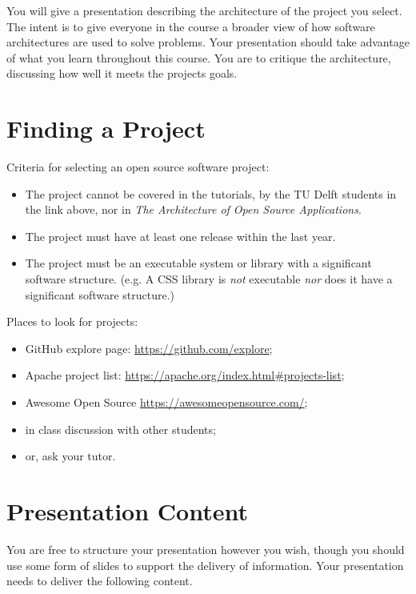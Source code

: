 \documentclass{csse4400}
\begin{document}
You will give a presentation describing the architecture of the project you select.
The intent is to give everyone in the course a broader view of how software architectures are used to solve problems.
Your presentation should take advantage of what you learn throughout this course.
You are to critique the architecture, discussing how well it meets the projects goals.


\section{Finding a Project}
Criteria for selecting an open source software project:
\begin{itemize}[topsep=4pt,partopsep=1pt,itemsep=2pt,parsep=2pt]
    \item The project cannot be covered in the tutorials, by the TU Delft students in the link above,
          nor in \textit{The Architecture of Open Source Applications}.
    \item The project must have at least one release within the last year.
    \item The project must be an executable system or library with a significant software structure.
          (e.g. A CSS library is \textit{not} executable \textit{nor} does it have a significant software structure.)
\end{itemize}

\noindent%
 Places to look for projects:
\begin{itemize}[topsep=4pt,partopsep=1pt,itemsep=2pt,parsep=2pt]
    \item GitHub explore page: \url{https://github.com/explore};
    \item Apache project list: \url{https://apache.org/index.html#projects-list};
    \item Awesome Open Source \url{https://awesomeopensource.com/};
    \item in class discussion with other students;
    \item or, ask your tutor.
\end{itemize}


\section{Presentation Content}
You are free to structure your presentation however you wish,
though you should use some form of slides to support the delivery of information.
Your presentation needs to deliver the following content.
\end{document}
